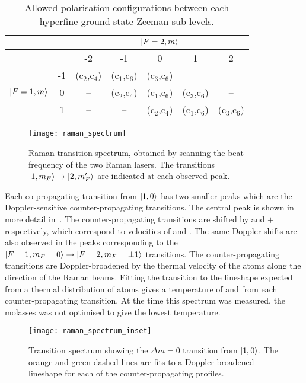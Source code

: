 \begin{table}
  \centering
  \begin{tabular}{ccccccc}
    \toprule
     & & \multicolumn{5}{c}{\(\ket{F=2,m}\)} \\
     \midrule
     & & -2 & -1 & 0 & 1 & 2 \\
     \multirow{3}{*}{\(\ket{F=1,m}\)} & -1 & (c\(_2\),c\(_4\)) &
     (c\(_1\),c\(_6\)) &(c\(_3\),c\(_6\))& -- & --  \\
     & 0 &-- & (c\(_2\),c\(_4\))& (c\(_1\),c\(_6\)) & (c\(_3\),c\(_6\))
     &-- \\
     & 1 & --& --&(c\(_2\),c\(_4\))& (c\(_1\),c\(_6\)) & (c\(_3\),c\(_6\)) \\
    \bottomrule
  \end{tabular}
  \caption{Allowed polarisation configurations between each hyperfine
  ground state Zeeman sub-levels.}
  \label{tab:raman_trans}
\end{table}
\begin{figure}[htpb]
  \centering
  \texttt{[image: raman\_spectrum]}
  \caption[Raman transition spectrum]{Raman transition spectrum, obtained by scanning the beat
    frequency of the two Raman lasers. The transitions \(\ket{1,m_F}
  \rightarrow \ket{2,m_F'}\) are indicated at each observed peak.}
  \label{fig:raman_spectrum}
\end{figure}
\par\noindent
Each co-propagating transition from \(\ket{1,0}\) has two smaller
peaks which are the Doppler-sensitive counter-propagating transitions.
The central peak is shown in more detail
in~. The counter-propagating
transitions are shifted by  and
\(+\) respectively, which correspond to
velocities of  and
. The same Doppler shifts are also
observed in the peaks corresponding to the \(\ket{F=1,m_F = 0}
\rightarrow \ket{F=2,m_F=\pm 1}\) transitions. The counter-propagating transitions are
Doppler-broadened by the thermal velocity of the atoms along the direction
of the Raman beams. Fitting the transition to the lineshape expected
from a thermal distribution of atoms gives a temperature of
 and  from
each counter-propagating transition. At the time this spectrum was
measured, the molasses was not optimised to give the lowest
temperature.
\begin{figure}[htpb!]
  \centering
  \texttt{[image: raman\_spectrum\_inset]}
  \caption[\(\Delta m = 0\) transition spectrum.]{Transition spectrum showing the \(\Delta m = 0\) transition
  from \(\ket{1,0}\). The orange and green dashed lines are fits to a
Doppler-broadened lineshape for each of the counter-propagating
profiles.}
  \label{fig:raman_spectrum_inset}
\end{figure}
